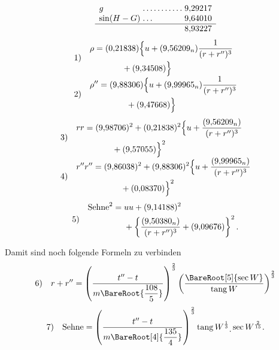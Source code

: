 \[
\begin{array}{l@{\;}l@{\;}r}
g&\mathord{.}\,\mathord{.}\,\mathord{.}\,\mathord{.}\,\mathord{.}\,\mathord{.}\,\mathord{.}\,\mathord{.}\,\mathord{.}\,\mathord{.}\,\mathord{.}&9{,}29217\\
\sin(H-G)&\mathord{.}\,\mathord{.}\,\mathord{.}&9{,}64010\\\hline
&&8{,}93227
\end{array}
\]
\[
\begin{array}{l@{\quad}l}
1)&\begin{aligned}\rho={}&(0{,}21838)\Bigl\{u+(9{,}56209_n)\frac{1}{(r+r'')^3}\\
&\qquad{}+(9{,}34508)\Bigr\}\end{aligned}\\[7pt]
2)&\begin{aligned}\rho''={}&(9{,}88306)\Bigl\{u+(9{,}99965_n)\frac{1}{(r+r'')^3}\\
&\qquad{}+(9{,}47668)\Bigr\}\end{aligned}
\end{array}
\]
\[
\begin{array}{l@{\quad}l}
3)&\begin{aligned}rr={}&(9{,}98706)^2+(0{,}21838)^2\Bigl\{u+\frac{(9{,}56209_n)}{(r+r'')^3}\\
&\qquad{}+(9{,}57055)\Bigr\}^2\end{aligned}\\[7pt]
4)&\begin{aligned}r''r''={}&(9{,}86038)^2+(9{,}88306)^2\Bigl\{u+\frac{(9{,}99965_n)}{(r+r'')^3}\\
&\qquad{}+(0{,}08370)\Bigr\}^2\end{aligned}
\end{array}
\]
\[
\begin{array}{l@{\quad}l}
5)&\begin{aligned}\text{Sehne}^2={}&uu+(9{,}14188)^2\\
&+\left\{\frac{(9{,}50380_n)}{(r+r'')^3}+(9{,}09676)\right\}^2.
\end{aligned}
\end{array}
\]

Damit sind noch folgende Formeln zu verbinden
\[
\begin{array}{l@{\quad}l}
6)&\displaystyle r+r''=\left(\frac{t''-t}{m\BareRoot{\dfrac{108}{5}}}\right)^{\frac{2}{3}}\left(\frac{\BareRoot[5]{\sec W}}{\operatorname{tang}W}\right)^{\frac{2}{3}}
\end{array}
\]
\[
\begin{array}{l@{\quad}l}
7)&\displaystyle\text{Sehne}=\left(\frac{t''-t}{m\BareRoot[4]{\dfrac{135}{4}}}\right)^{\frac{2}{3}}\operatorname{tang}W^{\frac{1}{3}}\mathord{\raisebox{-.6ex}{.}}\sec W^{\frac{2}{15}}.
\end{array}
\]

